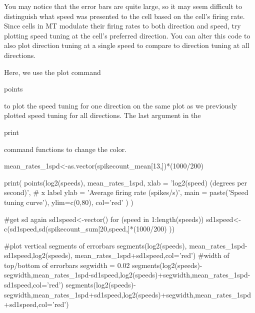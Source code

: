 \documentclass[
letterpaper, %
11pt, %
 oneside, 
onecolumn, %
]{memoir}
\numberwithin{Exercise}{chapter}
\begin{document}
You may notice that the error bars are quite large, so it may seem difficult to distinguish what speed was presented to the cell based on the cell's firing rate. Since cells in MT modulate their firing rates to both direction and speed, try plotting speed tuning at the cell's preferred direction. You can alter this code to also plot direction tuning at a single speed to compare to direction tuning at all directions. 

Here, we use the plot command \begin{ttfamily}points\end{ttfamily} to plot the speed tuning for one direction on the same plot as we previously plotted speed tuning for all directions. The last argument in the \begin{ttfamily}print\end{ttfamily} command functions to change the color.

\begin{shortrcode}
mean_rates_1spd<-as.vector(spikecount_mean[13,])*(1000/200)

print(
  points(log2(speeds),
       mean_rates_1spd,
       xlab = 'log2(speed) (degrees per second)', # x label
       ylab = 'Average firing rate (spikes/s)',
       main = paste('Speed tuning curve'),
       ylim=c(0,80),
       col='red'
  )
)

#get sd again
sd1speed<-vector()
for (speed in 1:length(speeds)){
  sd1speed<-c(sd1speed,sd(spikecount_sum[20,speed,]*(1000/200) ))
}

#plot vertical segments of errorbars
segments(log2(speeds), mean_rates_1spd-sd1speed,log2(speeds), mean_rates_1spd+sd1speed,col='red')
#width of top/bottom of errorbars
segwidth = 0.02
segments(log2(speeds)-segwidth,mean_rates_1spd-sd1speed,log2(speeds)+segwidth,mean_rates_1spd-sd1speed,col='red')
segments(log2(speeds)-segwidth,mean_rates_1spd+sd1speed,log2(speeds)+segwidth,mean_rates_1spd+sd1speed,col='red')
\end{shortrcode}   
\end{document}
